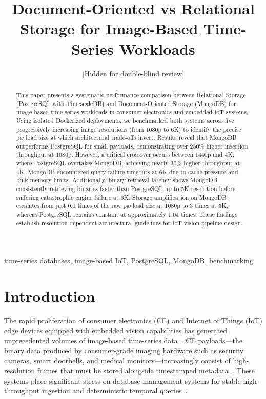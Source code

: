 \documentclass[conference, a4paper]{IEEEtran}
\begin{document}
\title{Document-Oriented vs Relational Storage for Image-Based Time-Series Workloads}

\author{
[Hidden for double-blind review]
}


\maketitle

\begin{abstract}
This paper presents a systematic performance comparison between Relational Storage (PostgreSQL with TimescaleDB) and Document-Oriented Storage (MongoDB) for image-based time-series workloads in consumer electronics and embedded IoT systems. Using isolated Dockerized deployments, we benchmarked both systems across five progressively increasing image resolutions (from 1080p to 6K) to identify the precise payload size at which architectural trade-offs invert. Results reveal that MongoDB outperforms PostgreSQL for small payloads, demonstrating over 250\% higher insertion throughput at 1080p. However, a critical crossover occurs between 1440p and 4K, where PostgreSQL overtakes MongoDB, achieving nearly 30\% higher throughput at 4K. MongoDB encountered query failure timeouts at 6K due to cache pressure and bulk memory limits. Additionally, binary retrieval latency shows MongoDB consistently retrieving binaries faster than PostgreSQL up to 5K resolution before suffering catastrophic engine failure at 6K. Storage amplification on MongoDB escalates from just 0.1 times of the raw payload size at 1080p to 3 times at 5K, whereas PostgreSQL remains constant at approximately 1.04 times. These findings establish resolution-dependent architectural guidelines for IoT vision pipeline design.
\end{abstract}

\begin{IEEEkeywords}
time-series databases, image-based IoT, PostgreSQL, MongoDB, benchmarking
\end{IEEEkeywords}

\section{Introduction}
\label{sec:introduction} 

The rapid proliferation of consumer electronics (CE) and Internet of Things (IoT) edge devices equipped with embedded vision capabilities has generated unprecedented volumes of image-based time-series data~\cite{ieee_ce_definition}. CE payloads---the binary data produced by consumer-grade imaging hardware such as security cameras, smart doorbells, and medical monitors---increasingly consist of high-resolution frames that must be stored alongside timestamped metadata~\cite{intuz_iot_databases,ceec_tsdb_review}. These systems place significant stress on database management systems for stable high-throughput ingestion and deterministic temporal queries~\cite{jensen_tsms_survey,nerc_tsdb_survey}.
\end{document}
